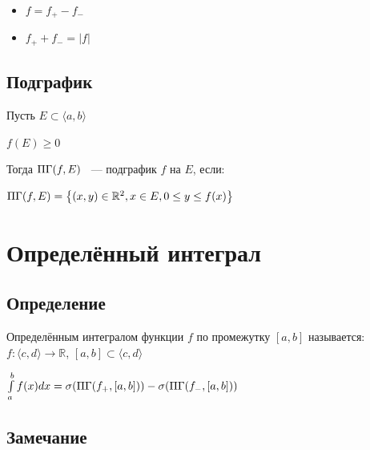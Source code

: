 \documentclass{article}
\begin{document}
	        \begin{itemize}
	    
	            \item $f = f_+ - f_-$
	        
	            \item $f_+ + f_- = |f|$
	        
	        \end{itemize}
	    
	    \subsection{Подграфик}
	    
            Пусть $E \subset \langle a, b \rangle$
        
            $f(E) \geq 0$
        
            Тогда $\Pi\Gamma(f, E)$ ~--- подграфик $f$ на $E$, если:
        
	        $\Pi\Gamma (f, E) = \left\{ (x, y) \in \mathbb{R}^2, x \in E, 0 \leq y \leq f(x) \right\}$
	    
	\newpage

	\section{Определённый интеграл}

        \subsection{Определение}
        
            Определённым интегралом функции $f$ по промежутку $[a, b]$ называется: $f: \langle c, d \rangle \rightarrow \mathbb{R}$, $[a, b] \subset \langle c, d \rangle$
        
            $\int\limits^b_a f(x)dx = \sigma (\Pi\Gamma (f_+, [a, b])) - \sigma (\Pi\Gamma (f_-, [a, b]))$
		
		\subsection{Замечание}
		
\end{document}
